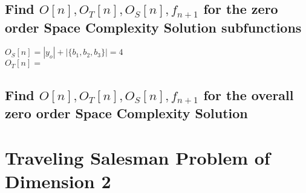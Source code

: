 \documentclass[11pt]{article}
\begin{document}
\subsection{Find $O[n], O_T[n], O_S[n],f_{n+1}$ for the zero order Space Complexity Solution subfunctions}
\begin{center}
$
O_S[n] = |y_o| + |\{b_1,b_2,b_3\}| = 4
$
\\ \vspace{2mm}
$
O_T[n] = 
$
\end{center}

\subsection{Find $O[n], O_T[n], O_S[n],f_{n+1}$ for the overall zero order Space Complexity Solution}




\newpage
\section*{Traveling Salesman Problem of Dimension 2}
\end{document}
